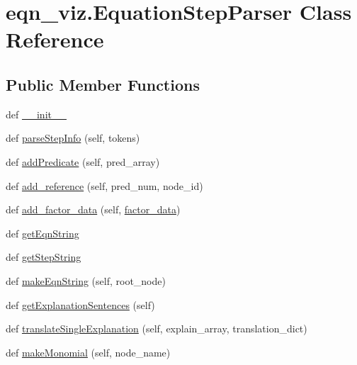 \hypertarget{classeqn__viz_1_1_equation_step_parser}{}\section{eqn\+\_\+viz.\+Equation\+Step\+Parser Class Reference}
\label{classeqn__viz_1_1_equation_step_parser}
\subsection*{Public Member Functions}
\begin{DoxyCompactItemize}
\item 
def \hyperlink{classeqn__viz_1_1_equation_step_parser_a15f0da684dd315e98aa51421644884c2}{\+\_\+\+\_\+init\+\_\+\+\_\+}
\item 
def \hyperlink{classeqn__viz_1_1_equation_step_parser_a17476a93cc389e6b6ff3cca6778f46cd}{parse\+Step\+Info} (self, tokens)
\item 
def \hyperlink{classeqn__viz_1_1_equation_step_parser_ab1e327235f1cd9edb6ff37dbd2231d62}{add\+Predicate} (self, pred\+\_\+array)
\item 
def \hyperlink{classeqn__viz_1_1_equation_step_parser_a0e2c2fb8bad5162a69985be04ab81995}{add\+\_\+reference} (self, pred\+\_\+num, node\+\_\+id)
\item 
def \hyperlink{classeqn__viz_1_1_equation_step_parser_ac7b001529b1a1f2b7bd411bc1e518cd8}{add\+\_\+factor\+\_\+data} (self, \hyperlink{classeqn__viz_1_1_equation_step_parser_a0b9f938bbf87279aa6284bc2d679332f}{factor\+\_\+data})
\item 
def \hyperlink{classeqn__viz_1_1_equation_step_parser_aad5d44ac662041cefc24a8e4f7a0e55d}{get\+Eqn\+String}
\item 
def \hyperlink{classeqn__viz_1_1_equation_step_parser_a7510435afe0c95bbf07e0895ba13da0e}{get\+Step\+String}
\item 
def \hyperlink{classeqn__viz_1_1_equation_step_parser_a9e9425456d883fe9fab6b4e55214f991}{make\+Eqn\+String} (self, root\+\_\+node)
\item 
def \hyperlink{classeqn__viz_1_1_equation_step_parser_a24ec3f761c115b46db184415e6f633fb}{get\+Explanation\+Sentences} (self)
\item 
def \hyperlink{classeqn__viz_1_1_equation_step_parser_a9364158c5fce0d6e8aed3afbf29f5aa3}{translate\+Single\+Explanation} (self, explain\+\_\+array, translation\+\_\+dict)
\item 
def \hyperlink{classeqn__viz_1_1_equation_step_parser_ae7c224d4c109b04a786ed6759dc594c0}{make\+Monomial} (self, node\+\_\+name)

\end{DoxyCompactItemize}
